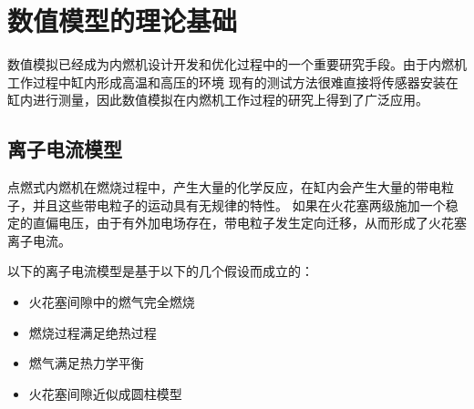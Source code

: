 \chapter{数值模型的理论基础}
数值模拟已经成为内燃机设计开发和优化过程中的一个重要研究手段。由于内燃机工作过程中缸内形成高温和高压的环境
现有的测试方法很难直接将传感器安装在缸内进行测量，因此数值模拟在内燃机工作过程的研究上得到了广泛应用。
\section{离子电流模型}
点燃式内燃机在燃烧过程中，产生大量的化学反应，在缸内会产生大量的带电粒子\cite{ljwwty2008}，并且这些带电粒子的运动具有无规律的特性。
如果在火花塞两级施加一个稳定的直偏电压，由于有外加电场存在，带电粒子发生定向迁移，从而形成了火花塞离子电流。\par
以下的离子电流模型是基于以下的几个假设而成立的：
\begin{itemize}
\item 火花塞间隙中的燃气完全燃烧
\item 燃烧过程满足绝热过程
\item 燃气满足热力学平衡
\item 火花塞间隙近似成圆柱模型
\end{itemize}

